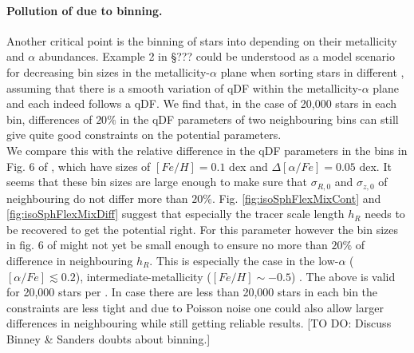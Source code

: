 \paragraph{Pollution of \MAPs due to binning.} Another critical point is the binning of stars into \MAPs depending on their metallicity and $\alpha$ abundances. Example 2 in \S ??? could be understood as a model scenario for decreasing bin sizes in the metallicity-$\alpha$ plane when sorting stars in different \MAPs, assuming that there is a smooth variation of qDF within the metallicity-$\alpha$ plane and each \MAP indeed follows a qDF. We find that, in the case of 20,000 stars in each bin, differences of $20\%$ in the qDF parameters of two neighbouring bins can still give quite good constraints on the potential parameters. 
\\We compare this with the relative difference in the qDF parameters in the bins in Fig. 6 of \cite{bov13}, which have sizes of $[Fe/H] = 0.1$ dex and $\Delta [\alpha/Fe] = 0.05$ dex. It seems that these bin sizes are large enough to make sure that $\sigma_{R,0}$ and $\sigma_{z,0}$ of neighbouring \MAPs do not differ more than $20\%$. Fig. \ref{fig:isoSphFlexMixCont} and \ref{fig:isoSphFlexMixDiff} suggest that especially the tracer scale length $h_R$ needs to be recovered to get the potential right. For this parameter however the bin sizes in fig. 6 of \cite{bov13} might not yet be small enough to ensure no more than $20\%$ of difference in neighbouring $h_R$. This is especially the case in the low-$\alpha$ ($[\alpha/Fe] \lesssim 0.2$), intermediate-metallicity ($[Fe/H] \sim -0.5$) \MAPs. The above is valid for 20,000 stars per \MAP. In case there are less than 20,000 stars in each bin the constraints are less tight and due to Poisson noise one could also allow larger differences in neighbouring \MAPs while still getting reliable results. [TO DO: Discuss Binney \& Sanders doubts about binning.]

